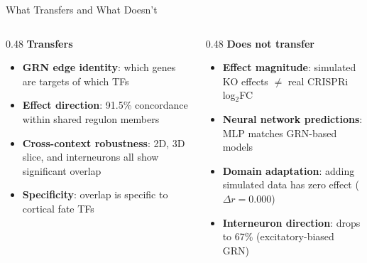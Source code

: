 \documentclass[aspectratio=169,11pt]{beamer}
\begin{document}
\begin{frame}{What Transfers and What Doesn't}

\begin{columns}[T]
\begin{column}{0.48\textwidth}
{\large\textcolor{pollengreen}{\textbf{Transfers}}}

\vspace{0.3em}
\begin{itemize}
    \item \textbf{GRN edge identity}: which genes are targets of which TFs
    \item \textbf{Effect direction}: 91.5\% concordance within shared regulon members
    \item \textbf{Cross-context robustness}: 2D, 3D slice, and interneurons all show significant overlap
    \item \textbf{Specificity}: overlap is specific to cortical fate TFs
\end{itemize}
\end{column}

\begin{column}{0.48\textwidth}
{\large\textcolor{pandored}{\textbf{Does not transfer}}}

\vspace{0.3em}
\begin{itemize}
    \item \textbf{Effect magnitude}: simulated KO effects $\neq$ real CRISPRi log$_2$FC
    \item \textbf{Neural network predictions}: MLP matches GRN-based models
    \item \textbf{Domain adaptation}: adding simulated data has zero effect ($\Delta r = 0.000$)
    \item \textbf{Interneuron direction}: drops to 67\% (excitatory-biased GRN)
\end{itemize}
\end{column}
\end{columns}

\vspace{0.8em}
\centering
{}

\end{frame}
\end{document}
